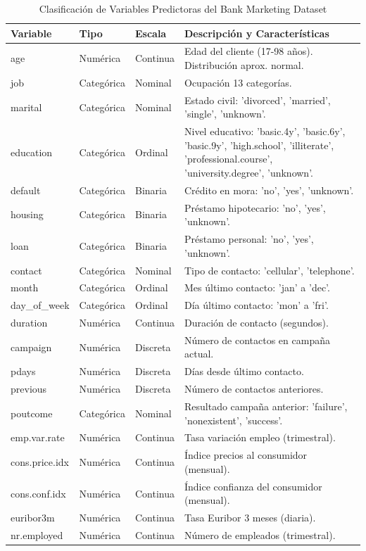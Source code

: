 \documentclass[10pt]{article}
\begin{document}
\begin{table}[h!]
\centering
\caption{Clasificación de Variables Predictoras del Bank Marketing Dataset}
\label{tab:clasificacion_predictores}
\begin{tabular}{p{1.7cm} p{1.8cm} p{1.2cm} p{9.4cm}}
\toprule
\textbf{Variable} & \textbf{Tipo} & \textbf{Escala} & \textbf{Descripción y Características} \\
\midrule
age & Numérica & Continua & Edad del cliente (17-98 años). Distribución aprox. normal. \\
job & Categórica & Nominal & Ocupación 13 categorías. \\
marital & Categórica & Nominal & Estado civil: 'divorced', 'married', 'single', 'unknown'. \\
education & Categórica & Ordinal & Nivel educativo: 'basic.4y', 'basic.6y', 'basic.9y', 'high.school', 'illiterate', 'professional.course', 'university.degree', 'unknown'. \\
default & Categórica & Binaria & Crédito en mora: 'no', 'yes', 'unknown'. \\
housing & Categórica & Binaria & Préstamo hipotecario: 'no', 'yes', 'unknown'.\\
loan & Categórica & Binaria & Préstamo personal: 'no', 'yes', 'unknown'. \\
contact & Categórica & Nominal & Tipo de contacto: 'cellular', 'telephone'. \\
month & Categórica & Ordinal & Mes último contacto: 'jan' a 'dec'. \\
day\_of\_week & Categórica & Ordinal & Día último contacto: 'mon' a 'fri'. \\
duration & Numérica & Continua & Duración de contacto (segundos). \\
campaign & Numérica & Discreta & Número de contactos en campaña actual. \\
pdays & Numérica & Discreta & Días desde último contacto. \\
previous & Numérica & Discreta & Número de contactos anteriores. \\
poutcome & Categórica & Nominal & Resultado campaña anterior: 'failure', 'nonexistent', 'success'. \\
emp.var.rate & Numérica & Continua & Tasa variación empleo (trimestral). \\
cons.price.idx & Numérica & Continua & Índice precios al consumidor (mensual). \\
cons.conf.idx & Numérica & Continua & Índice confianza del consumidor (mensual).\\
euribor3m & Numérica & Continua & Tasa Euribor 3 meses (diaria). \\
nr.employed & Numérica & Continua & Número de empleados (trimestral). \\
\bottomrule
\end{tabular}
\end{table}
\end{document}
